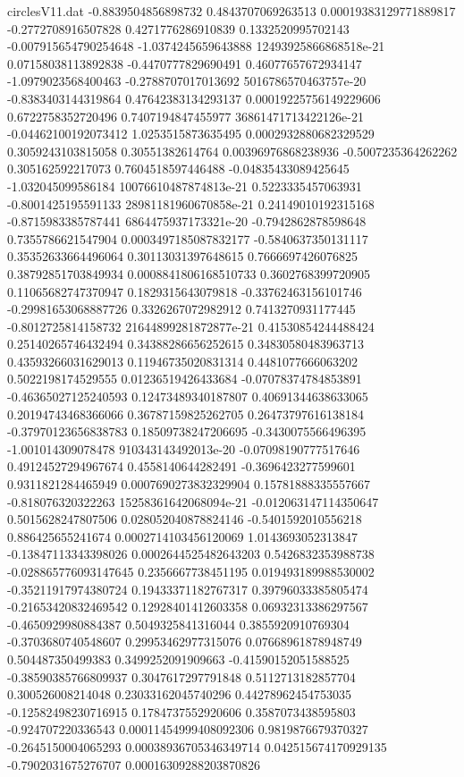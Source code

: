 \begin{filecontents}{circlesV11.dat}
-0.8839504856898732	0.4843707069263513	0.00019383129771889817
-0.2772708916507828	0.4271776286910839	0.1332520995702143
-0.007915654790254648	-1.0374245659643888	12493925866868518e-21
0.07158038113892838	-0.4470777829690491	0.46077657672934147
-1.0979023568400463	-0.2788707017013692	5016786570463757e-20
-0.8383403144319864	0.47642383134293137	0.00019225756149229606
0.6722758352720496	0.7407194847455977	36861471713422126e-21
-0.04462100192073412	1.0253515873635495	0.0002932880682329529
0.3059243103815058	0.30551382614764	0.00396976868238936
-0.5007235364262262	0.305162592217073	0.7604518597446488
-0.04835433089425645	-1.032045099586184	10076610487874813e-21
0.5223335457063931	-0.8001425195591133	28981181960670858e-21
0.24149010192315168	-0.8715983385787441	6864475937173321e-20
-0.7942862878598648	0.7355786621547904	0.0003497185087832177
-0.5840637350131117	0.35352633664496064	0.30113031397648615
0.7666697426076825	0.38792851703849934	0.0008841806168510733
0.3602768399720905	0.11065682747370947	0.1829315643079818
-0.33762463156101746	-0.29981653068887726	0.3326267072982912
0.7413270931177445	-0.8012725814158732	21644899281872877e-21
0.41530854244488424	0.25140265746432494	0.34388286656252615
0.34830580483963713	0.43593266031629013	0.11946735020831314
0.4481077666063202	0.5022198174529555	0.01236519426433684
-0.07078374784853891	-0.46365027125240593	0.12473489340187807
0.40691344638633065	0.20194743468366066	0.36787159825262705
0.26473797616138184	-0.37970123656838783	0.18509738247206695
-0.3430075566496395	-1.001014309078478	910343143492013e-20
-0.07098190777517646	0.49124527294967674	0.4558140644282491
-0.3696423277599601	0.9311821284465949	0.0007690273832329904
0.15781888335557667	-0.818076320322263	15258361642068094e-21
-0.012063147114350647	0.5015628247807506	0.028052040878824146
-0.5401592010556218	0.886425655241674	0.0002714103456120069
1.0143693052313847	-0.13847113343398026	0.0002644525482643203
0.5426832353988738	-0.028865776093147645	0.2356667738451195
0.019493189988530002	-0.35211917974380724	0.19433371182767317
0.39796033385805474	-0.21653420832469542	0.12928401412603358
0.06932313386297567	-0.4650929980884387	0.5049325841316044
0.3855920910769304	-0.3703680740548607	0.29953462977315076
0.07668961878948749	0.504487350499383	0.3499252091909663
-0.41590152051588525	-0.38590385766809937	0.3047617297791848
0.5112713182857704	0.300526008214048	0.23033162045740296
0.44278962454753035	-0.12582498230716915	0.1784737552920606
0.3587073438595803	-0.924707220336543	0.00011454999408092306
0.9819876679370327	-0.2645150004065293	0.00038936705346349714
0.042515674170929135	-0.7902031675276707	0.00016309288203870826

\end{filecontents}
